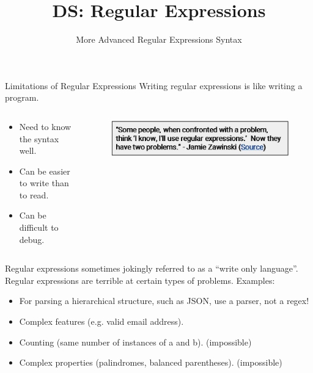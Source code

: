 \documentclass[aspectratio=169]{../latex_main/tntbeamer}  %
\title[Introduction]{DS: Regular Expressions}
\subtitle{More Advanced Regular Expressions Syntax}
\begin{document}
	
	\maketitle
	\begin{frame}{Limitations of Regular Expressions}
	  Writing regular expressions is like writing a program.
	  \begin{columns}
	       
	   \begin{column}{.4\textwidth}
	    
	 
	 
	    \begin{itemize}
	        \item Need to know the syntax well.
	        \item Can be easier to write than to read.
	        \item Can be difficult to debug.
	    \end{itemize}
	   \end{column}
	   \begin{column}{.6\textwidth}
	    
	   
	    \begin{figure}
            \centering
            \includegraphics[scale=.7]{Bild14}
        \end{figure}
        \end{column}
         \end{columns}
	    Regular expressions sometimes jokingly referred to as a “write only language”.\\
	    Regular expressions are terrible at certain types of problems. Examples:
	    \begin{itemize}
	        \item For parsing a hierarchical structure, such as JSON, use a parser, not a regex!
	        \item Complex features (e.g. valid email address).
	        \item Counting (same number of instances of a and b). (impossible)
	        \item Complex properties (palindromes, balanced parentheses). (impossible)
	    \end{itemize}
	\end{frame}
	
\end{document}
